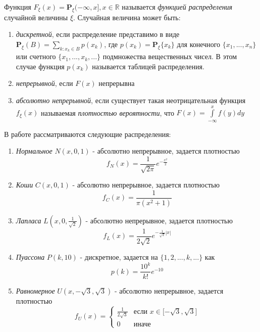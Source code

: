 \documentclass[12pt,a4paper]{article}
\begin{document}
Функция $F_\xi(x)=\mathbf{P}_\xi\mathopen{(-\infty}, x\mathclose{ ] },x\in\mathbb{R}$ называется \textit{функцией распределения} случайной величины $\xi$. Случайная величина может быть:

\begin{enumerate}
	\item \textit{дискретной}, если распределение представимо в виде $\mathbf{P}_\xi(B)=\sum\limits_{k:x_k\in{B}}{p(x_k)}$, где \newline
	$p(x_k)=\mathbf{P}_\xi{\{ x_k \}}$ для конечного $\{x_1, ..., x_n\}$ или счетного 
	$\{x_1, ..., x_k, ...\}$ подмножества вещественных чисел. В этом случае функция $p(x_k)$ называется таблицей распределения.
	
	\item \textit{непрерывной}, если $F(x)$ непрерывна
	
	\item \textit{абсолютно непрерывной}, если существует такая неотрицательная функция $f_\xi(x)$ называемая \textit{плотностью вероятности}, что $F(x)=\int\limits_{-\infty}^{x}{f(y)dy}$
\end{enumerate}

В работе рассматриваются следующие распределения:

\begin{enumerate}
	\item \textit{Нормальное} $N(x, 0, 1)$ - абсолютно непрерывное, задается плотностью
	\begin{equation}
	f_N(x)=\frac{1}{\sqrt{2\pi}}e^{-\frac{x^2}{2}}
	\end{equation}
	
	\item \textit{Коши} $C(x, 0, 1)$ - абсолютно непрерывное, задается плотностью
	\begin{equation}
	f_C(x)=\frac{1}{\pi(x^2+1)}
	\end{equation}
	
	\item \textit{Лапласа} $L(x, 0, \frac{1}{\sqrt{2}})$ - абсолютно непрерывное, задается плотностью
	\begin{equation}
	f_L(x)=\frac{1}{2\sqrt{2}}e^{-\frac{1}{\sqrt{2}}|x|}
	\end{equation}
	
	\item \textit{Пуассона} $P(k, 10)$ - дискретное, задается на $\{1, 2, ..., k, ...\}$ как
	\begin{equation}
	p(k)=\frac{10^k}{k!}e^{-10}
	\end{equation} 
	
	\item \textit{Равномерное} $U(x, -\sqrt{3}, \sqrt{3})$ - абсолютно непрерывное, задается плотностью 
	\begin{equation}
	f_U(x) = 
	\begin{cases}
	\frac{1}{2\sqrt{3}} &\text{если $x \in \mathopen[-\sqrt{3}, \sqrt{3}\mathclose] $}\\
	0 &\text{иначе}
	\end{cases}
	\end{equation}	
\end{enumerate}
\end{document}
